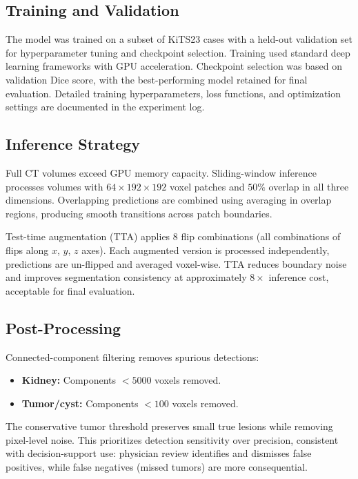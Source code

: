 \subsection{Training and Validation}

The model was trained on a subset of KiTS23 cases with a held-out validation set for hyperparameter tuning and checkpoint selection. Training used standard deep learning frameworks with GPU acceleration. Checkpoint selection was based on validation Dice score, with the best-performing model retained for final evaluation. Detailed training hyperparameters, loss functions, and optimization settings are documented in the experiment log.

\subsection{Inference Strategy}

Full CT volumes exceed GPU memory capacity. Sliding-window inference processes volumes with $64 \times 192 \times 192$ voxel patches and $50\%$ overlap in all three dimensions. Overlapping predictions are combined using averaging in overlap regions, producing smooth transitions across patch boundaries.

Test-time augmentation (TTA) applies 8 flip combinations (all combinations of flips along $x$, $y$, $z$ axes). Each augmented version is processed independently, predictions are un-flipped and averaged voxel-wise. TTA reduces boundary noise and improves segmentation consistency at approximately $8\times$ inference cost, acceptable for final evaluation.

\subsection{Post-Processing}

Connected-component filtering removes spurious detections:
\begin{itemize}
    \item \textbf{Kidney:} Components $< 5000$ voxels removed.
    \item \textbf{Tumor/cyst:} Components $< 100$ voxels removed.
\end{itemize}

The conservative tumor threshold preserves small true lesions while removing pixel-level noise. This prioritizes detection sensitivity over precision, consistent with decision-support use: physician review identifies and dismisses false positives, while false negatives (missed tumors) are more consequential.

